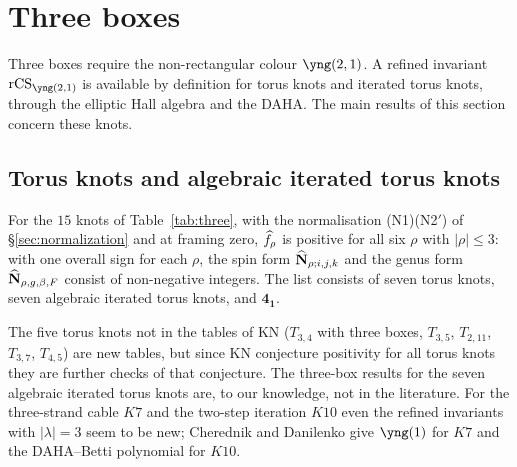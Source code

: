 \section{Three boxes}\label{sec:three}

Three boxes require the non-rectangular colour $\yng(2,1)$.
A refined invariant $\rCS_{\yng(2,1)}$ is available by definition for torus knots and iterated torus knots, through the elliptic Hall algebra and the DAHA.
The main results of this section concern these knots.

\subsection{Torus knots and algebraic iterated torus knots}
\begin{compresult}\label{cr:three}
For the $15$ knots of Table~\ref{tab:three}, with the normalisation {\rm(N1)(N2$'$)} of \S\ref{sec:normalization} and at framing zero,
$\widehat{f}_\rho$ is positive for all six $\rho$ with $|\rho|\le3$:
with one overall sign for each $\rho$, the spin form $\widehat{\mathbf{N}}_{\rho;i,j,k}$ and the genus form $\widehat{\mathbf{N}}_{\rho,g,\beta,F}$ consist of non-negative integers.
The list consists of seven torus knots, seven algebraic iterated torus knots, and $\mathbf{4_1}$.
\end{compresult}
\begin{table}[h]
\centering
\caption[Tests up to three boxes at framing zero]{Tests up to three boxes at framing zero. A check mark means that there are no negative terms in the spin form and in the genus form; the number in parentheses is the number of terms of the spin form.
The rows $T_{2,3}$, $T_{2,5}$ and $\mathbf{4_1}$ reproduce tables of KN; for $\mathbf{4_1}$ with $\protect\yng(2,1)$ the KN candidate is used.}\label{tab:three}
\sbox\tabbox{}\resizebox{\textwidth}{!}{\usebox\tabbox}
\end{table}
The five torus knots not in the tables of KN ($T_{3,4}$ with three boxes, $T_{3,5}$, $T_{2,11}$, $T_{3,7}$, $T_{4,5}$) are new tables, but since KN conjecture positivity for all torus knots they are further checks of that conjecture.
The three-box results for the seven algebraic iterated torus knots are, to our knowledge, not in the literature.
For the three-strand cable $K7$ and the two-step iteration $K10$ even the refined invariants with $|\lambda|=3$ seem to be new;
Cherednik and Danilenko \cite{Cherednik14} give $\yng(1)$ for $K7$ and the DAHA--Betti polynomial for $K10$.

